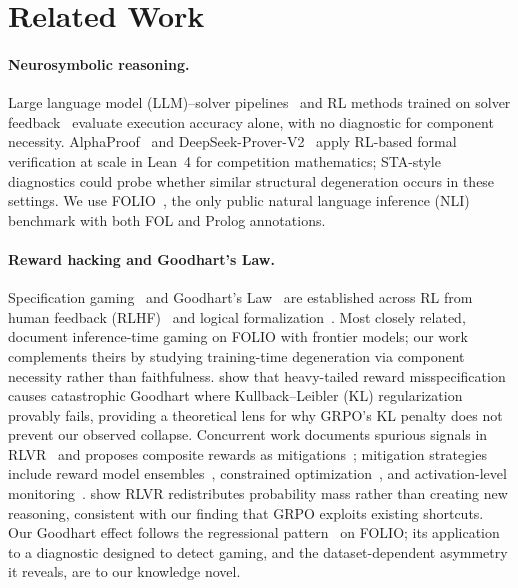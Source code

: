 \section{Related Work}
\label{sec:related-work}

\paragraph{Neurosymbolic reasoning.}
Large language model (LLM)--solver pipelines~\citep{satlm, logic-lm, linc, fover-pei2025, lorp, nlproofs} and RL methods trained on solver feedback~\citep{mellgren-prolog-grpo, logic-rl, deepseek-prover-v15, deepseek-r1, rlsf} evaluate execution accuracy alone, with no diagnostic for component necessity.
AlphaProof~\citep{alphaproof2025} and DeepSeek-Prover-V2~\citep{deepseek-prover-v2} apply RL-based formal verification at scale in Lean~4 for competition mathematics; STA-style diagnostics could probe whether similar structural degeneration occurs in these settings.
We use FOLIO~\citep{folio}, the only public natural language inference (NLI) benchmark with both FOL and Prolog annotations.

\paragraph{Reward hacking and Goodhart's Law.}
Specification gaming~\citep{krakovna2020specification} and Goodhart's Law~\citep{manheim-goodhart-taxonomy, skalse-reward-hacking, karwowski-goodhart-rl} are established across RL from human feedback (RLHF)~\citep{gao-reward-overoptimization} and logical formalization~\citep{bondarenko-spec-gaming, kim-game-formalization}.
Most closely related, \citet{kim-game-formalization} document inference-time gaming on FOLIO with frontier models; our work complements theirs by studying training-time degeneration via component necessity rather than faithfulness.
\citet{kwa-catastrophic-goodhart} show that heavy-tailed reward misspecification causes catastrophic Goodhart where Kullback--Leibler (KL) regularization provably fails, providing a theoretical lens for why GRPO's KL penalty does not prevent our observed collapse.
Concurrent work documents spurious signals in RLVR~\citep{spurious-rewards, yan2026spurious, dong2026probing, metr-reward-hacking, helff2026gaming, nishimura2026specgaming, khalifa2026countdown} and proposes composite rewards as mitigations~\citep{tarek2025reward, pronesti2026beyond};
mitigation strategies include reward model ensembles~\citep{coste2023reward}, constrained optimization~\citep{moskovitz2023confronting}, and activation-level monitoring~\citep{wilhelm2026monitoring}. \citet{yue2025rl-reasoning} show RLVR redistributes probability mass rather than creating new reasoning, consistent with our finding that GRPO exploits existing shortcuts.
Our Goodhart effect follows the regressional pattern~\citep{manheim-goodhart-taxonomy} on FOLIO; its application to a diagnostic designed to detect gaming, and the dataset-dependent asymmetry it reveals, are to our knowledge novel.

